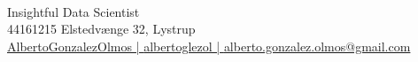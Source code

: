 
\author{\textcolor{\primaryColorToUse}{Alberto 
 }\textcolor{\secondaryColorToUse}{ 
 Gonz\'alez Olmos}} %
\def\phone{ 44161215 }
\def\city{ Elstedvænge 32, Lystrup}
\def\github{ AlbertoGonzalezOlmos | } %
\def\LinkedIn{ albertoglezol | } %
\def\email{alberto.gonzalez.olmos@gmail.com}
\def\role{Insightful Data Scientist} %


\begin{center}
	\begin{minipage}[b]{1\textwidth}
	\makeatletter
	\centering {\huge \@author} \\
	\makeatother
    \vspace{1.5em}
    {\Large{\role}} \\
	\vspace{1em}
	{\faMobile*}{\phone}%
	{\faMapMarker*}{\small \city} \\ %
	\href{https://github.com/\github}{\faGithub \github}%
	\href{https://www.linkedin.com/in/\LinkedIn}{\faLinkedin   \LinkedIn} %
	\href{mailto:\email}{ \email}  %
	\end{minipage}
\end{center}


